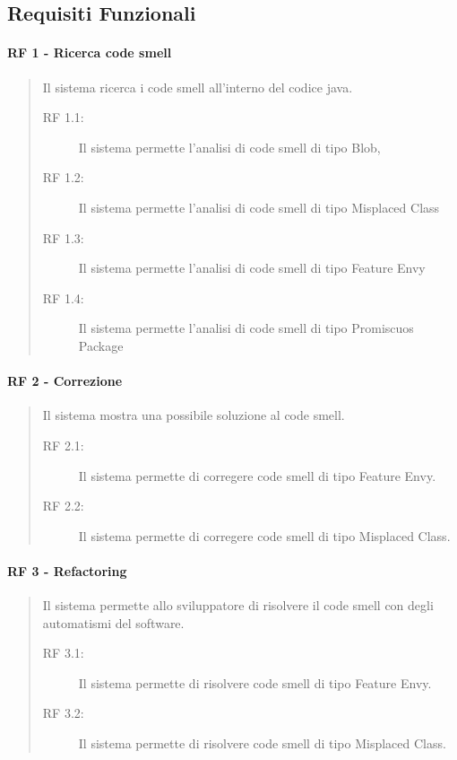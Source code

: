	\subsection{Requisiti Funzionali}
		\paragraph{RF 1 - Ricerca code smell}  
		\begin{quote}Il sistema ricerca i code smell all'interno del codice java.	
			\begin{description}
				\item [RF 1.1:]Il sistema permette l'analisi di code smell di tipo Blob,
				\item [RF 1.2:]Il sistema permette l'analisi di code smell di tipo Misplaced Class
				\item [RF 1.3:]Il sistema permette l'analisi di code smell di tipo Feature Envy
				\item [RF 1.4:]Il sistema permette l'analisi di code smell di tipo Promiscuos Package
			\end{description}
		\end{quote}
		
		
		
		\paragraph{RF 2 - Correzione} 
		\begin{quote}Il sistema mostra una possibile soluzione al code smell.
			\begin{description}
				\item [RF 2.1:] Il sistema permette di corregere code smell di tipo Feature Envy.
				\item [RF 2.2:] Il sistema permette di corregere code smell di tipo Misplaced Class.
			\end{description}
		\end{quote}
		
		
		\paragraph{RF 3 - Refactoring} 
		\begin{quote}Il sistema permette allo sviluppatore di risolvere il code smell con degli automatismi del software.
			\begin{description}
				\item [RF 3.1:] Il sistema permette di risolvere code smell di tipo Feature Envy.
				\item [RF 3.2:] Il sistema permette di risolvere code smell di tipo Misplaced Class.
			\end{description}
		\end{quote}
		
